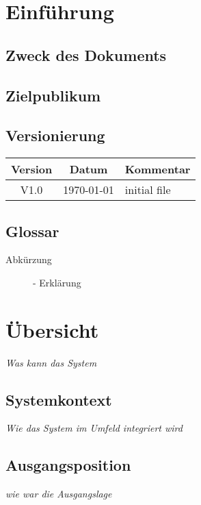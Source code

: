 \documentclass[a4paper, 10pt, fleqn]{article}
\begin{document}
	\begin{titlepage}
		\titleGM
		\thispagestyle{empty}
	\end{titlepage}
	
	\tableofcontents
	\listoffigures
	\listoftables
	
	\clearpage
	\section{Einführung}
		\subsection{Zweck des Dokuments}
		\subsection{Zielpublikum}
		\subsection{Versionierung}
			\begin{table}[h]
				\centering
				\begin{tabularx}{\textwidth}{|c|c|X|}
				\hline
				\rowcolor{shadecolor}\textbf{Version} & \textbf{Datum} & \textbf{Kommentar}\\ \hline
				V1.0 & \today & initial file \\ \hline
				\end{tabularx}
			\end{table}
		\subsection{Glossar}
			\begin{description}
				\item[Abkürzung]- Erklärung
			\end{description}

	\section{Übersicht}
		\textit{Was kann das System}
		\subsection{Systemkontext}
			\textit{Wie das System im Umfeld integriert wird}
		\subsection{Ausgangsposition}
			\textit{wie war die Ausgangslage}
\end{document}
